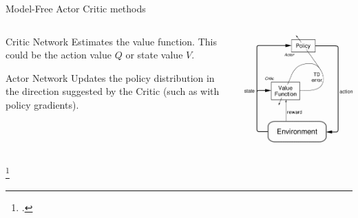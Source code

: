\documentclass[aspectratio=169]{beamer}
\begin{document}
	\begin{frame}{Model-Free Actor Critic methods}
		\begin{columns}
			\begin{column}{0.5\linewidth}
				\begin{exampleblock}{Critic Network}
					Estimates the value function. This could be the action value $Q$ or state value $V$.
				\end{exampleblock}
				\begin{exampleblock}{Actor Network}
					Updates the policy distribution in the direction suggested by the Critic (such as with policy gradients).
				\end{exampleblock}
			\end{column}
			\begin{column}{0.5\linewidth}
				\centering
				\includegraphics[width=0.8\linewidth]{img/actor_critic.png}
			\end{column}
		\end{columns}
		\footcite*{sutton2018reinforcement}
		
	\end{frame}
	
\end{document}
